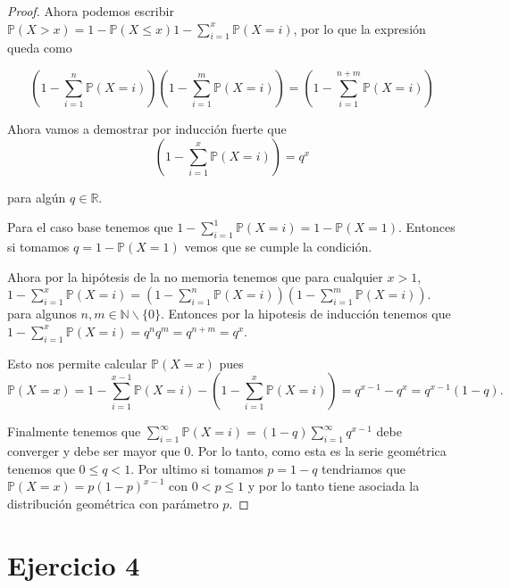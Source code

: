 \documentclass[paper=letter, fontsize=11pt]{scrartcl} %
\numberwithin{equation}{section} %
\numberwithin{figure}{section} %
\numberwithin{table}{section} %
\newcommand{\prob}[1]{\mathbb{P}(#1)}
\begin{document}
\begin{enumerate}[label = \arabic*)]
\begin{proof}
Ahora podemos escribir $ \prob{X>x}=1-\prob{X\leq x} 1-\sum_{i=1}^x \prob{X=i} $, por lo que la expresión queda como

\begin{equation}
(1-\sum_{i=1}^n \prob{X=i})(1-\sum_{i=1}^m \prob{X=i})=(1-\sum_{i=1}^{n+m} \prob{X=i})
\end{equation}

Ahora vamos a demostrar por inducción fuerte que
 \begin{equation}
 (1-\sum_{i=1}^x \prob{X=i}) = q^x
 \end{equation}
 
 para algún $ q \in \mathbb{R} $.

Para el caso base tenemos que $ 1-\sum_{i=1}^1 \prob{X=i} = 1-\prob{X=1} $. Entonces si tomamos $ q = 1-\prob{X=1} $ vemos que se cumple la condición.

Ahora por la hipótesis de la no memoria tenemos que para cualquier $ x>1  $, $\displaystyle 1-\sum_{i=1}^x \prob{X = i} = (1-\sum_{i=1}^n \prob{X=i})(1-\sum_{i=1}^m \prob{X=i}) $. para algunos $ n,m \in \mathbb{N} \backslash \{0\} $. Entonces por la hipotesis de inducción tenemos que  $ \displaystyle 1-\sum_{i=1}^x \prob{X = i} = q^nq^m=q^{n+m}= q^x $.

Esto nos permite calcular $ \prob{X = x} $ pues 
\begin{equation}
\prob{X=x}= 1-\sum_{i=1}^{x-1}\prob{X=i}-(1-\sum_{i=1}^{x} \prob{X=i}) = q^{x-1}-q^{x} = q^{x-1}(1-q). \nonumber
\end{equation}

Finalmente tenemos que $ \sum_{i=1}^\infty \prob{X=i} = (1-q)\sum_{i=1}^\infty q^{x-1} $ debe converger y debe ser mayor que 0. Por lo tanto, como esta es la serie geométrica tenemos que $ 0 \leq q < 1 $. Por ultimo si tomamos $ p = 1- q $ tendriamos que $ \prob{X=x} = p(1-p)^{x-1} $ con $ 0<p\leq 1 $ y por lo tanto tiene asociada la distribución geométrica con parámetro $ p $.
\end{proof}
\end{enumerate}

\section{Ejercicio 4}
\end{document}
